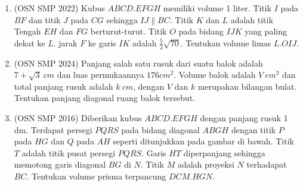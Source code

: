 \documentclass[12pt]{scrartcl}
\begin{document}
\begin{enumerate}
\begin{center}
    \end{center}

    \item (OSN SMP 2022) Kubus $ABCD.EFGH$ memiliki volume 1 liter. Titik $I$ pada $BF$ dan titik $J$ pada $CG$ sehingga $IJ \parallel BC$. Titik $K$ dan $L$ adalah titik Tengah $EH$ dan $FG$ berturut-turut. Titik $O$ pada bidang $IJK$ yang paling dekat ke $L$. jarak $F$ ke garis $IK$ adalah $\frac{5}{2}\sqrt{70}$. Tentukan volume limas $L.OIJ$.

    \item (OSN SMP 2024) Panjang salah satu rusuk dari suatu balok adalah $7 + \sqrt{3}~cm$ dan luas permukaannya $176 cm^2$. Volume balok adalah $V~cm^3$ dan total panjang rusuk adalah $k~cm$, dengan $V$ dan $k$ merupakan bilangan bulat. Tentukan panjang diagonal ruang balok tersebut.

    \item (OSN SMP 2016) Diberikan kubus $ABCD.EFGH$ dengan panjang rusuk 1 dm. Terdapat persegi $PQRS$ pada bidang diagonal $ABGH$ dengan titik $P$ pada $HG$ dan $Q$ pada $AH$ seperti ditunjukkan pada gambar di bawah. Titik $T$ adalah titik pusat persegi $PQRS$. Garis $HT$ diperpanjang sehingga memotong garis diagonal $BG$ di $N$. Titik $M$ adalah proyeksi $N$ terhadapat $BC$. Tentukan volume prisma terpancung $DCM.HGN$.
    \begin{center}
\end{center}
\end{enumerate}
\end{document}
